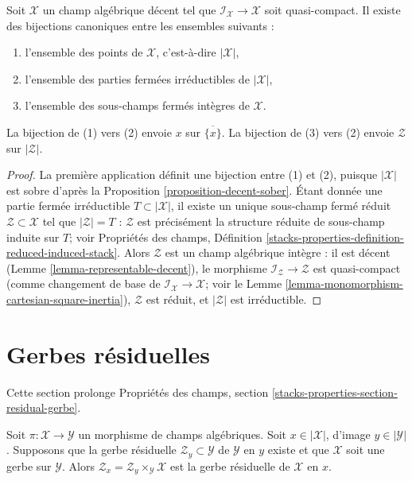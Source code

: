 \begin{lemma}
\label{lemma-decent-irreducible-closed}
Soit $\mathcal{X}$ un champ alg\'ebrique d\'ecent tel que
$\mathcal{I}_\mathcal{X} \to \mathcal{X}$ soit quasi-compact.
Il existe des bijections canoniques entre les ensembles suivants :
\begin{enumerate}
\item l'ensemble des points de $\mathcal{X}$, c'est-\`a-dire $|\mathcal{X}|$,
\item l'ensemble des parties ferm\'ees irr\'eductibles de $|\mathcal{X}|$,
\item l'ensemble des sous-champs ferm\'es int\`egres de $\mathcal{X}$.
\end{enumerate}
La bijection de (1) vers (2) envoie $x$ sur $\overline{\{x\}}$.
La bijection de (3) vers (2) envoie $\mathcal{Z}$ sur $|\mathcal{Z}|$.
\end{lemma}

\begin{proof}
La premi\`ere application d\'efinit une bijection entre (1) et (2), puisque
$|\mathcal{X}|$ est sobre d'apr\`es la Proposition \ref{proposition-decent-sober}.
\'Etant donn\'ee une partie ferm\'ee irr\'eductible $T \subset |\mathcal{X}|$,
il existe un unique sous-champ ferm\'e r\'eduit $\mathcal{Z} \subset \mathcal{X}$
tel que $|\mathcal{Z}| = T$ : $\mathcal{Z}$ est pr\'ecis\'ement
la structure r\'eduite de sous-champ induite sur $T$; voir
Propri\'et\'es des champs, D\'efinition
\ref{stacks-properties-definition-reduced-induced-stack}.
Alors $\mathcal{Z}$ est un champ alg\'ebrique int\`egre : il est
d\'ecent (Lemme \ref{lemma-representable-decent}), le
morphisme $\mathcal{I}_\mathcal{Z} \to \mathcal{Z}$ est quasi-compact
(comme changement de base de $\mathcal{I}_\mathcal{X} \to \mathcal{X}$; voir
le Lemme \ref{lemma-monomorphism-cartesian-square-inertia}),
$\mathcal{Z}$ est r\'eduit, et $|\mathcal{Z}|$ est irr\'eductible.
\end{proof}






\section{Gerbes r\'esiduelles}
\label{section-residual-gerbe}

\noindent
Cette section prolonge Propri\'et\'es des champs, section
\ref{stacks-properties-section-residual-gerbe}.

\begin{lemma}
\label{lemma-gerbe-residual-gerbe}
Soit $\pi : \mathcal{X} \to \mathcal{Y}$ un morphisme de champs alg\'ebriques.
Soit $x \in |\mathcal{X}|$, d'image $y \in |\mathcal{Y}|$.
Supposons que la gerbe r\'esiduelle $\mathcal{Z}_y \subset \mathcal{Y}$
de $\mathcal{Y}$ en $y$ existe et que $\mathcal{X}$ soit une gerbe
sur $\mathcal{Y}$. Alors
$\mathcal{Z}_x = \mathcal{Z}_y \times_\mathcal{Y} \mathcal{X}$ est
la gerbe r\'esiduelle de $\mathcal{X}$ en $x$.
\end{lemma}

